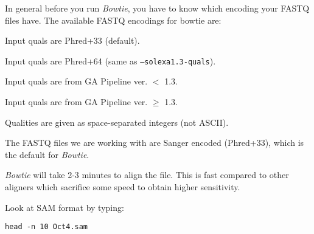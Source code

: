 \begin{note}
In general before you run \emph{Bowtie}, you have to know which encoding your FASTQ files
have. The available FASTQ encodings for bowtie are:

\begin{description}[style=multiline,labelindent=0cm,align=right,leftmargin=\descriptionlabelspace,rightmargin=1.5cm,font=\ttfamily]
 \item[--phred33-quals] Input quals are Phred+33 (default).
 \item[--phred64-quals] Input quals are Phred+64 (same as \texttt{--solexa1.3-quals}).
 \item[--solexa-quals] Input quals are from GA Pipeline ver. $<$ 1.3.
 \item[--solexa1.3-quals] Input quals are from GA Pipeline ver. $\geq$ 1.3.
 \item[--integer-quals] Qualities are given as space-separated integers (not ASCII).
\end{description}

The FASTQ files we are working with are Sanger encoded (Phred+33), which is the
default for \emph{Bowtie}.

\emph{Bowtie} will take 2-3 minutes to align the file. This is fast compared to
other aligners which sacrifice some speed to obtain higher sensitivity.
\end{note}

\begin{steps}
Look at SAM format by typing:

\begin{lstlisting}
head -n 10 Oct4.sam
\end{lstlisting}
\end{steps}

